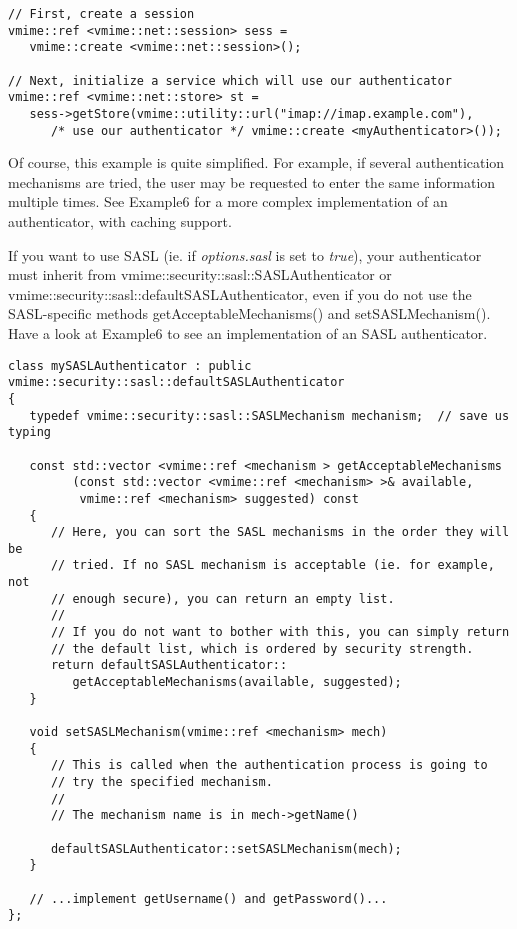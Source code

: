 \begin{lstlisting}
// First, create a session
vmime::ref <vmime::net::session> sess =
   vmime::create <vmime::net::session>();

// Next, initialize a service which will use our authenticator
vmime::ref <vmime::net::store> st =
   sess->getStore(vmime::utility::url("imap://imap.example.com"),
      /* use our authenticator */ vmime::create <myAuthenticator>());
\end{lstlisting}


Of course, this example is quite simplified. For example, if several
authentication mechanisms are tried, the user may be requested to enter the
same information multiple times. See  {\vexample Example6} for a more complex
implementation of an authenticator, with caching support.

If you want to use SASL (ie. if \emph{options.sasl} is set to \emph{true}),
your authenticator must inherit from
{\vcode vmime::security::sasl::SASLAuthenticator} or
{\vcode vmime::security::sasl::defaultSASLAuthenticator}, even if you do not
use the SASL-specific methods {\vcode getAcceptableMechanisms()} and
{\vcode setSASLMechanism()}. Have a look at {\vexample Example6} to see an
implementation of an SASL authenticator.

\begin{lstlisting}[caption={A simple SASL authenticator}]
class mySASLAuthenticator : public vmime::security::sasl::defaultSASLAuthenticator
{
   typedef vmime::security::sasl::SASLMechanism mechanism;  // save us typing

   const std::vector <vmime::ref <mechanism > getAcceptableMechanisms
         (const std::vector <vmime::ref <mechanism> >& available,
          vmime::ref <mechanism> suggested) const
   {
      // Here, you can sort the SASL mechanisms in the order they will be
      // tried. If no SASL mechanism is acceptable (ie. for example, not
      // enough secure), you can return an empty list.
      //
      // If you do not want to bother with this, you can simply return
      // the default list, which is ordered by security strength.
      return defaultSASLAuthenticator::
         getAcceptableMechanisms(available, suggested);
   }

   void setSASLMechanism(vmime::ref <mechanism> mech)
   {
      // This is called when the authentication process is going to
      // try the specified mechanism.
      //
      // The mechanism name is in mech->getName()

      defaultSASLAuthenticator::setSASLMechanism(mech);
   }

   // ...implement getUsername() and getPassword()...
};
\end{lstlisting}


